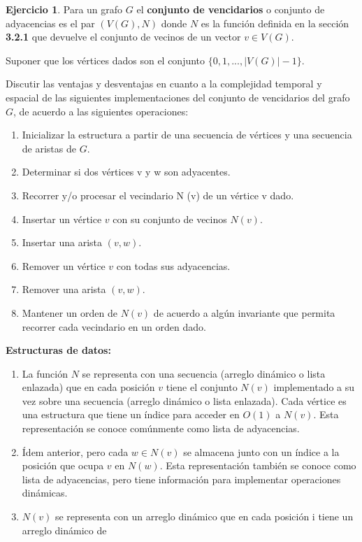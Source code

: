 \documentclass[12pt]{article}
\theoremstyle{definition}
\newtheorem{ejercicio}{Ejercicio}
\begin{document}
\begin{ejercicio}
    Para un grafo $G$ el \textbf{conjunto de vencidarios} o conjunto de adyacencias es el par $(V(G), N)$ 
    donde $N$ es la función definida en la sección \textbf{3.2.1} que devuelve el conjunto de vecinos de un 
    vector $v \in V(G)$.

    Suponer que los vértices dados son el conjunto $\{0, 1, ..., |V(G)|-1\}$.
    
    Discutir las ventajas y desventajas en cuanto a la complejidad temporal y espacial de las siguientes 
    implementaciones del conjunto de vencidarios del grafo $G$, de acuerdo a las siguientes operaciones:
    \begin{enumerate}
        \item Inicializar la estructura a partir de una secuencia de vértices y una secuencia de aristas 
        de $G$.
        \item Determinar si dos vértices v y w son adyacentes.
        \item Recorrer y/o procesar el vecindario N (v) de un vértice v dado.
        \item Insertar un vértice $v$ con su conjunto de vecinos $N (v)$.
        \item Insertar una arista $(v, w)$.
        \item Remover un vértice $v$ con todas sus adyacencias.
        \item Remover una arista $(v, w)$.
        \item Mantener un orden de $N (v)$ de acuerdo a algún invariante que permita recorrer cada vecindario
         en un orden dado.
    \end{enumerate}
    \textbf{Estructuras de datos:}
    \begin{enumerate}
        \item La función $N$ se representa con una secuencia (arreglo dinámico o lista enlazada) que en 
        cada posición $v$ tiene el conjunto $N (v)$ implementado a su vez sobre una secuencia (arreglo 
        dinámico o lista enlazada). Cada vértice es una estructura que tiene un índice para acceder en $O(1)$ 
        a $N (v)$. Esta representación se conoce comúnmente como lista de adyacencias.
        \item Ídem anterior, pero cada $w \in N (v)$ se almacena junto con un índice a la posición que ocupa 
        $v$ en $N (w)$. Esta representación también se conoce como lista de adyacencias, pero tiene información 
        para implementar operaciones dinámicas.
        \item $N (v)$ se representa con un arreglo dinámico que en cada posición i tiene un arreglo dinámico de 

\end{enumerate}
\end{ejercicio}
\end{document}
